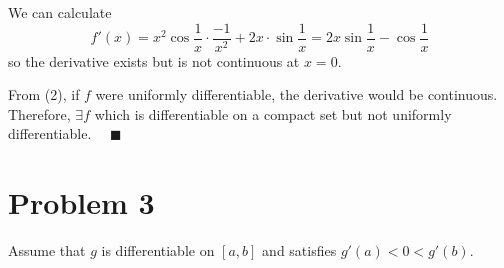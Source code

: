 \documentclass[12pt]{article}
\newcommand{\qed}{\quad \blacksquare}
\begin{document}
\begin{enumerate}
            We can calculate 
            \[f'(x) = x^2\cos\frac{1}{x} \cdot \frac{-1}{x^2} + 2x \cdot \sin \frac{1}{x} = 2x \sin \frac{1}{x} - \cos \frac{1}{x}\]
            so the derivative exists but is not continuous at $x = 0$. 

            From (2), if $f$ were uniformly differentiable, the derivative would be continuous. Therefore, $\exists f$ which is differentiable on a compact set but not uniformly differentiable. $\qed$ 
        \color{black}

\end{enumerate}

\pagebreak

\section{Problem 3}
Assume that $g$ is differentiable on $[a,b]$ and satisfies $g'(a)<0<g'(b)$.
\end{document}
